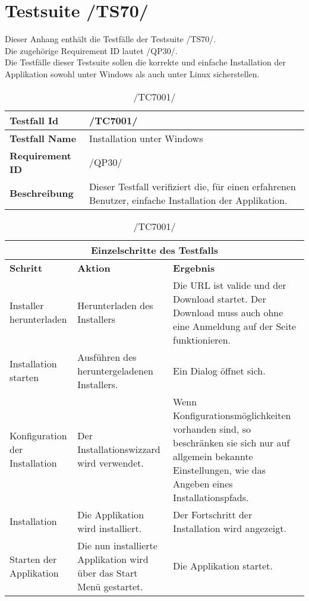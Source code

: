 \chapter{Testsuite /TS70/}
Dieser Anhang enthält die Testfälle der Testsuite /TS70/.\\
Die zugehörige Requirement ID lautet /QP30/.\\
\newline
Die Testfälle dieser Testsuite sollen die korrekte und einfache Installation der Applikation sowohl unter Windows als auch unter Linux sicherstellen.\\

\begin{table}[h]
\caption{/TC7001/}
\label{tab:TC7001}
\begin{center}
\begin{tabular}{|p{3.5cm}|p{12cm}|}
\hline
\textbf{Testfall Id} & /TC7001/\\
\hline
\textbf{Testfall Name} & Installation unter Windows\\
\hline
\textbf{Requirement ID} & /QP30/\\
\hline
\textbf{Beschreibung} & Dieser Testfall verifiziert die, für einen erfahrenen Benutzer, einfache Installation der Applikation.\\
\hline
\end{tabular}
\begin{tabular}{|p{2.5cm}|p{5cm}|p{7.55cm}|}
\multicolumn{3}{|c|}{\textbf{Einzelschritte des Testfalls}} \\
\hline
\textbf{Schritt} & \textbf{Aktion} & \textbf{Ergebnis}\\
\hline
Installer herunterladen & Herunterladen des Installers & Die URL ist valide und der Download startet. Der Download muss auch ohne eine Anmeldung auf der Seite funktionieren.\\
\hline
Installation starten & Ausführen des heruntergeladenen Installers. & Ein Dialog öffnet sich. \\
\hline
Konfiguration der Installation & Der Installationswizzard wird verwendet. & Wenn Konfigurationsmöglichkeiten vorhanden sind, so beschränken sie sich nur auf allgemein bekannte Einstellungen, wie das Angeben eines Installationspfads.\\
\hline
Installation & Die Applikation wird installiert. & Der Fortschritt der Installation wird angezeigt. \\
\hline
Starten der Applikation & Die nun installierte Applikation wird über das Start Menü gestartet. & Die Applikation startet. \\
\hline
\end{tabular}
\end{center}
\label{default}
\end{table}

